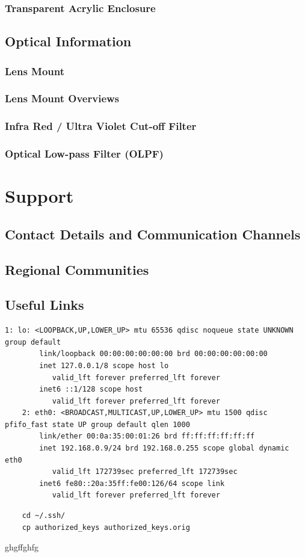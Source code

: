 \documentclass{article}
\begin{document}
\subsubsection{Transparent Acrylic Enclosure}
\subsection{Optical Information}
\subsubsection{Lens Mount}
\subsubsection{Lens Mount Overviews}
\subsubsection{Infra Red / Ultra Violet Cut-off Filter}
\subsubsection{Optical Low-pass Filter (OLPF)}

\section{Support}
\subsection{Contact Details and Communication Channels}
\subsection{Regional Communities}
\subsection{Useful Links}





\begin{lstlisting}[breaklines=true, breakatwhitespace=true]
    1: lo: <LOOPBACK,UP,LOWER_UP> mtu 65536 qdisc noqueue state UNKNOWN group default 
        link/loopback 00:00:00:00:00:00 brd 00:00:00:00:00:00
        inet 127.0.0.1/8 scope host lo
           valid_lft forever preferred_lft forever
        inet6 ::1/128 scope host 
           valid_lft forever preferred_lft forever
    2: eth0: <BROADCAST,MULTICAST,UP,LOWER_UP> mtu 1500 qdisc pfifo_fast state UP group default qlen 1000
        link/ether 00:0a:35:00:01:26 brd ff:ff:ff:ff:ff:ff
        inet 192.168.0.9/24 brd 192.168.0.255 scope global dynamic eth0
           valid_lft 172739sec preferred_lft 172739sec
        inet6 fe80::20a:35ff:fe00:126/64 scope link 
           valid_lft forever preferred_lft forever
\end{lstlisting}


\begin{lstlisting}
    cd ~/.ssh/
    cp authorized_keys authorized_keys.orig
\end{lstlisting}


ghgffghfg
\end{document}
